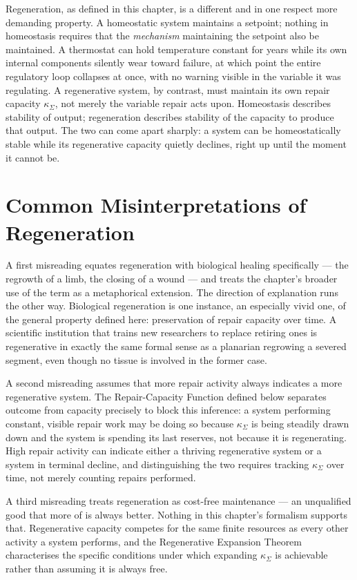 \documentclass[12pt,twoside,openright]{book}
\begin{document}
Regeneration, as defined in this chapter, is a different and
in one respect more demanding property. A homeostatic system
maintains a setpoint; nothing in homeostasis requires that
the \emph{mechanism} maintaining the setpoint also be
maintained. A thermostat can hold temperature constant for
years while its own internal components silently wear toward
failure, at which point the entire regulatory loop collapses
at once, with no warning visible in the variable it was
regulating. A regenerative system, by contrast, must
maintain its own repair capacity $\kappa_\Sigma$, not merely
the variable repair acts upon. Homeostasis describes
stability of output; regeneration describes stability of the
capacity to produce that output. The two can come apart
sharply: a system can be homeostatically stable while its
regenerative capacity quietly declines, right up until the
moment it cannot be.

\section{Common Misinterpretations of Regeneration}
\label{sec:ch11-misinterpretations}

A first misreading equates regeneration with biological
healing specifically --- the regrowth of a limb, the closing
of a wound --- and treats the chapter's broader use of the
term as a metaphorical extension. The direction of
explanation runs the other way. Biological regeneration is
one instance, an especially vivid one, of the general
property defined here: preservation of repair capacity over
time. A scientific institution that trains new researchers
to replace retiring ones is regenerative in exactly the same
formal sense as a planarian regrowing a severed segment,
even though no tissue is involved in the former case.

A second misreading assumes that more repair activity always
indicates a more regenerative system. The Repair-Capacity
Function defined below separates outcome from capacity
precisely to block this inference: a system performing
constant, visible repair work may be doing so because
$\kappa_\Sigma$ is being steadily drawn down and the system
is spending its last reserves, not because it is
regenerating. High repair activity can indicate either a
thriving regenerative system or a system in terminal decline,
and distinguishing the two requires tracking $\kappa_\Sigma$
over time, not merely counting repairs performed.

A third misreading treats regeneration as cost-free
maintenance --- an unqualified good that more of is always
better. Nothing in this chapter's formalism supports that.
Regenerative capacity competes for the same finite resources
as every other activity a system performs, and the
Regenerative Expansion Theorem characterises the specific
conditions under which expanding $\kappa_\Sigma$ is
achievable rather than assuming it is always free.
\end{document}
